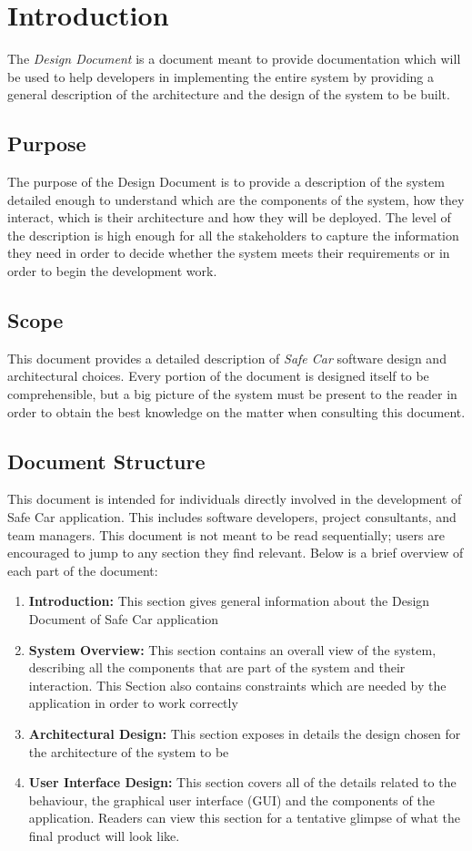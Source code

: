 \chapter{Introduction} \label{chap1}
The \textit{Design Document} is a document meant to provide documentation which will be used to help developers in implementing the entire system by providing a general description of the architecture and the design of the system to be built.

\section{Purpose}
The purpose of the Design Document is to provide a description of the system detailed enough to understand which are the components of the system, how they interact, which is their architecture and how they will be deployed. The level of the description is high enough for all the stakeholders to capture the information they need in order to decide whether the system meets their requirements or in order to begin the development work.

\section{Scope}
This document provides a detailed description of \textit{Safe Car} software design and architectural choices. Every portion of the document is designed itself to be comprehensible, but a big picture of the system must be present to the reader in order to obtain the best knowledge on the matter when consulting this document.

\section{Document Structure}
This document is intended for individuals directly involved in the development of Safe Car application. This includes software developers, project consultants, and team managers. This document is not meant to be read sequentially; users are encouraged to jump to any section they find relevant. Below is a brief overview of each part of the document:

\begin{enumerate}
	\item \textbf{Introduction:} This section gives general information about the Design Document of Safe Car application
	\item \textbf{System Overview:} This section contains an overall view of the system, describing all the components that are part of the system and their interaction. This Section also contains constraints which are needed by the application in order to work correctly
	\item \textbf{Architectural Design:} This section exposes in details the design chosen for the architecture of the system to be
	\item \textbf{User Interface Design:} This section covers all of the details related to the behaviour, the graphical user interface (GUI) and the components of the application. Readers can view this section for a tentative glimpse of what the final product will look like.
\end{enumerate}